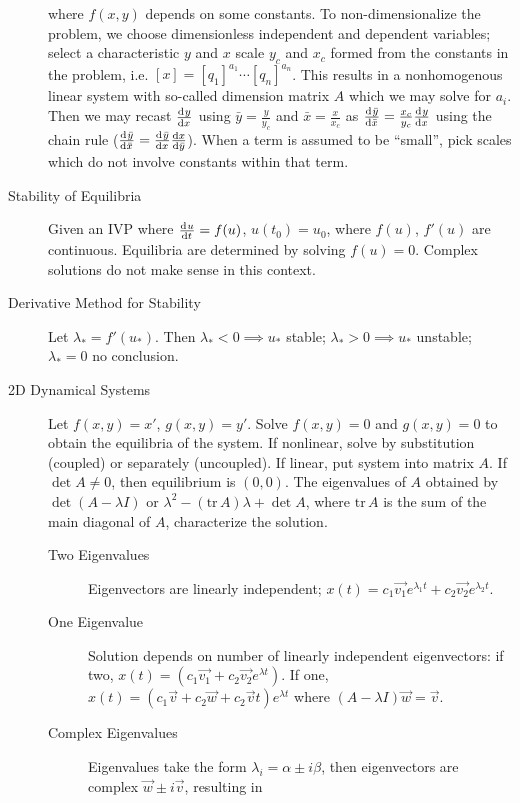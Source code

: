 \documentclass[8pt]{article}
\begin{document}
\begin{multicols}{2}
\begin{description}
    where $f(x,y)$ depends on some constants. To non-dimensionalize the problem,
    we choose dimensionless independent and dependent variables; select a
    characteristic $y$ and $x$ scale $y_c$ and $x_c$ formed from the constants
    in the problem, i.e. $[x]={[q_1]}^{a_1}\cdots {[q_n]}^{a_n}$. This results
    in a nonhomogenous linear system with so-called dimension matrix $A$ which
    we may solve for $a_i$. Then we may recast $\frac{\mathrm{d}^{} {y}}{\mathrm{d}{x}^{}}$ using
    $\bar{y}=\frac{y}{y_c}$ and $\bar{x}=\frac{x}{x_c}$ as
    $\frac{\mathrm{d}^{} {\bar{y}}}{\mathrm{d}{\bar{x}}^{}}=\frac{x_c}{y_c}\frac{\mathrm{d}^{} {y}}{\mathrm{d}{x}^{}}$ using the chain rule
    ($\frac{\mathrm{d}^{} {\bar{y}}}{\mathrm{d}{\bar{x}}^{}}=\frac{\mathrm{d}^{} {\bar{y}}}{\mathrm{d}{x}^{}}\frac{\mathrm{d}{x}}{\mathrm{d}{\bar{y}}}$). When a
    term is assumed to be ``small'', pick scales which do not involve constants
    within that term.

  \item[Stability of Equilibria] Given an IVP where $\frac{\mathrm{d}^{} {u}}{\mathrm{d}{t}^{}}=f(u)$,
    $u(t_0)=u_0$, where $f(u)$, $f'(u)$ are continuous. Equilibria are
    determined by solving $f(u)=0$. Complex solutions do not make sense in this
    context.
  \item[Derivative Method for Stability] Let $\lambda_*=f'(u_*)$. Then
    $\lambda_*<0\implies u_*$ stable; $\lambda_*>0\implies u_*$ unstable;
    $\lambda_*=0$ no conclusion.
  \item[2D Dynamical Systems] Let $f(x,y) = x'$, $g(x,y) = y'$. Solve $f(x,y)=0$
    and $g(x,y)=0$ to obtain the equilibria of the system. If nonlinear, solve
    by substitution (coupled) or separately (uncoupled). If linear, put system
    into matrix $A$. If $\det A \ne 0$, then equilibrium is $(0,0)$. The
    eigenvalues of $A$ obtained by $\det(A-\lambda I)$ or
    $\lambda^2-(\text{tr}\,A)\lambda+\det A$, where $\text{tr}\,A$ is the sum of
    the main diagonal of $A$, characterize the solution.
    \begin{description}
    \item[Two Eigenvalues] Eigenvectors are linearly independent;
      $x(t)=c_1\vec{v_1}e^{\lambda_1 t}+c_2\vec{v_2}e^{\lambda_2 t}$.
    \item[One Eigenvalue] Solution depends on number of linearly independent
      eigenvectors: if two, $x(t)=(c_1\vec{v_1}+c_2\vec{v_2}e^{\lambda t})$. If
      one, $x(t)=(c_1\vec{v}+c_2\vec{w}+c_2\vec{v}t)e^{\lambda t}$ where
      $(A-\lambda I)\vec{w}=\vec{v}$.
    \item[Complex Eigenvalues] Eigenvalues take the form $\lambda_i = \alpha \pm
      i\beta$, then eigenvectors are complex $\vec{w}\pm i\vec{v}$, resulting in

\end{description}
\end{description}
\end{multicols}
\end{document}
